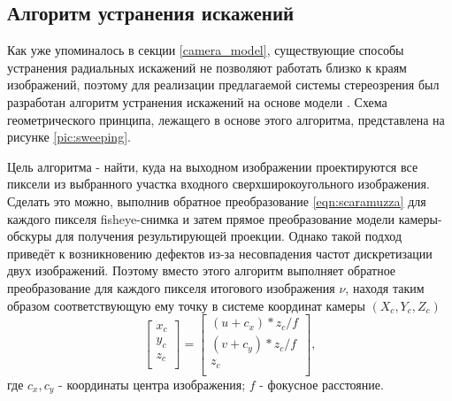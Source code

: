 \subsection{Алгоритм устранения искажений}

Как уже упоминалось в секции \ref{camera_model}, существующие способы устранения радиальных искажений не
позволяют работать близко к краям изображений, поэтому для реализации предлагаемой системы стереозрения     %
был разработан алгоритм устранения искажений на основе модели \cite{scaramuzza}. Схема геометрического
принципа, лежащего в основе этого алгоритма, представлена на рисунке \ref{pic:sweeping}.


Цель алгоритма - найти, куда на выходном изображении проектируются все пиксели из выбранного участка входного 
сверхширокоугольного изображения. Сделать это можно, выполнив обратное преобразование \ref{eqn:scaramuzza} для каждого пикселя 
fisheye-снимка и затем прямое преобразование модели камеры-обскуры для получения результирующей проекции. Однако такой подход 
приведёт к возникновению дефектов из-за несовпадения частот дискретизации двух изображений.                 %
Поэтому вместо этого алгоритм выполняет обратное преобразование  для каждого пикселя итогового изображения $\nu$, 
находя таким образом соответствующую ему точку в системе координат камеры $({X_c, Y_c, Z_c})$ 
\begin{equation}
    \label{eq:uv_to_xyz}
    \left[\begin{matrix}x_c\\y_c\\z_c\\\end{matrix}\right] = \left[\begin{matrix} {(u+c_x)*z_c}/f \\  {(v+c_y)*z_c}/f \\ z_c \\\end{matrix}\right],
\end{equation} 
где $c_x, c_y$ - координаты центра изображения; $f$ - фокусное расстояние. 

